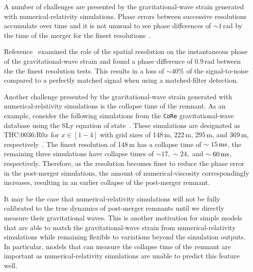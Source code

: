 \documentclass[../Thesis.tex]{subfiles}
\begin{document}
    A number of challenges are presented by the gravitational-wave strain generated with numerical-relativity simulations.
    Phase errors between successive resolutions accumulate over time and it is not unusual to see phase differences of $\sim 1$\,rad by the time of the merger for the finest resolutions~\cite[e.g.,][]{Radice2014b}.
  
    Reference~\cite{Takami2015} examined the role of the spatial resolution on the instantaneous phase of the gravitational-wave strain and found a phase difference of $0.9$\,rad between the the finest resolution tests.
    This results in a loss of $\sim 40\%$ of the signal-to-noise compared to a perfectly matched signal when using a matched-filter detection. \par
    
    Another challenge presented by the gravitational-wave strain generated with numerical-relativity simulations is the collapse time of the remnant.
    As an example, consider the following simulations from the \texttt{CoRe} gravitational-wave database using the SLy equation of state~\cite{Dietrich2018,Radice2016}.
    These simulations are designated as THC:0036:R0$x$ for $x \in [1-4]$ with grid sizes of 148\,m, 222\,m, 295\,m, and 369\,m, respectively~\cite{Radice2016}.
    The finest resolution of 148\,m has a collapse time of $\sim 15\,\mathrm{ms}$, the remaining three simulations have collapse times of $\sim 17, \sim 24,$ and $\sim 60\,\mathrm{ms}$, respectively.
    Therefore, as the resolution becomes finer to reduce the phase error in the post-merger simulations, the amount of numerical-viscosity correspondingly increases,  resulting in an earlier collapse of the post-merger remnant.
    \par
    
    It may be the case that numerical-relativity simulations will not be fully calibrated to the true dynamics of post-merger remnants until we directly measure their gravitational waves.
    This is another motivation for simple models that are able to match the gravitational-wave strain from numerical-relativity simulations while remaining flexible to variations beyond the simulation outputs.
    In particular, models that can measure the collapse time of the remnant are important as numerical-relativity simulations are unable to predict this feature well. \par
\end{document}

